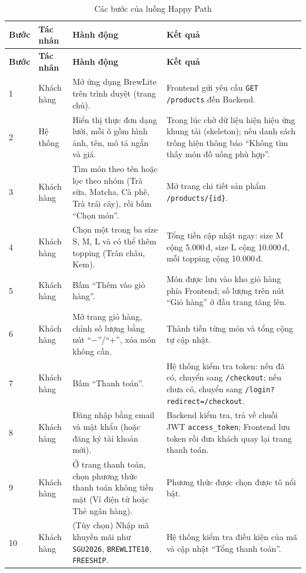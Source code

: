 \begin{longtable}{|p{0.9cm}|p{2.4cm}|p{5.6cm}|p{4.6cm}|}
  \caption{Các bước của luồng Happy Path}\label{tab:happy-path}\\
  \hline
  \textbf{Bước} & \textbf{Tác nhân} & \textbf{Hành động} & \textbf{Kết quả} \\
  \hline
  \endfirsthead
  \hline
  \textbf{Bước} & \textbf{Tác nhân} & \textbf{Hành động} & \textbf{Kết quả} \\
  \hline
  \endhead
  1 & Khách hàng & Mở ứng dụng BrewLite trên trình duyệt (trang chủ). & Frontend gửi yêu cầu \texttt{GET /products} đến Backend. \\
  \hline
  2 & Hệ thống & Hiển thị thực đơn dạng lưới, mỗi ô gồm hình ảnh, tên, mô tả ngắn và giá. & Trong lúc chờ dữ liệu hiện hiệu ứng khung tải (skeleton); nếu danh sách trống hiện thông báo ``Không tìm thấy món đồ uống phù hợp''. \\
  \hline
  3 & Khách hàng & Tìm món theo tên hoặc lọc theo nhóm (Trà sữa, Matcha, Cà phê, Trà trái cây), rồi bấm ``Chọn món''. & Mở trang chi tiết sản phẩm \texttt{/products/\{id\}}. \\
  \hline
  4 & Khách hàng & Chọn một trong ba size S, M, L và có thể thêm topping (Trân châu, Kem). & Tổng tiền cập nhật ngay: size M cộng 5.000\,đ, size L cộng 10.000\,đ, mỗi topping cộng 10.000\,đ. \\
  \hline
  5 & Khách hàng & Bấm ``Thêm vào giỏ hàng''. & Món được lưu vào kho giỏ hàng phía Frontend; số lượng trên nút ``Giỏ hàng'' ở đầu trang tăng lên. \\
  \hline
  6 & Khách hàng & Mở trang giỏ hàng, chỉnh số lượng bằng nút ``$-$''/``$+$'', xóa món không cần. & Thành tiền từng món và tổng cộng tự cập nhật. \\
  \hline
  7 & Khách hàng & Bấm ``Thanh toán''. & Hệ thống kiểm tra token: nếu đã có, chuyển sang \texttt{/checkout}; nếu chưa có, chuyển sang \texttt{/login?redirect=/checkout}. \\ 
  \hline
  8 & Khách hàng & Đăng nhập bằng email và mật khẩu (hoặc đăng ký tài khoản mới). & Backend kiểm tra, trả về chuỗi JWT \texttt{access\_token}; Frontend lưu token rồi đưa khách quay lại trang thanh toán. \\
  \hline
  9 & Khách hàng & Ở trang thanh toán, chọn phương thức thanh toán không tiền mặt (Ví điện tử hoặc Thẻ ngân hàng). & Phương thức được chọn được tô nổi bật. \\
  \hline
  10 & Khách hàng & (Tùy chọn) Nhập mã khuyến mãi như \texttt{SGU2026}, \texttt{BREWLITE10}, \texttt{FREESHIP}. & Hệ thống kiểm tra điều kiện của mã và cập nhật ``Tổng thanh toán''. \\

\end{longtable}
